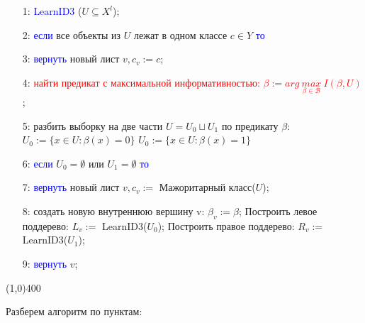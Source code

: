 \documentclass{article}
\begin{document}
\begin{itemize}
\item[1:] \textcolor{blue}{LearnID3} ($U \subseteq X^l$);

\item[2:] \textcolor{blue}{если}
				все объекты из $U$ лежат в одном классе $c \in Y$
			\textcolor{blue}{то}

\item[3:] \qquad \textcolor{blue}{вернуть} новый лист $v, c_v := c$;

\item[4:] \textcolor{red}{найти предикат с максимальной информативностью:}\newline
		\textcolor{red}{$\beta := arg\ \underset{\beta \in \mathscr{B}}{max}\ I(\beta, U)$};
			
\item[5:] разбить выборку на две части $U = U_0 \sqcup U_1$ по предикату $\beta$:\newline
			 $U_0 := \{x \in U: \beta(x) = 0\}$\newline
			 $U_0 := \{x \in U: \beta(x) = 1\}$

\item[6:] \textcolor{blue}{если}
				$U_0 = \emptyset$ или $U_1 = \emptyset$
			\textcolor{blue}{то}
			
\item[7:] \qquad \textcolor{blue}{вернуть} новый лист $v, c_v :=$ Мажоритарный класс($U$);

\item[8:] создать новую внутреннюю вершину v: $\beta_v := \beta$;\newline
			 Построить левое поддерево: $L_v :=$ LearnID3($U_0$);\newline
			 Построить правое поддерево: $R_v :=$ LearnID3($U_1$);

\item[9:] \textcolor{blue}{вернуть} $v$;

\end{itemize}

\begin{center}
\line(1,0){400}
\end{center}

Разберем алгоритм по пунктам:
\end{document}
